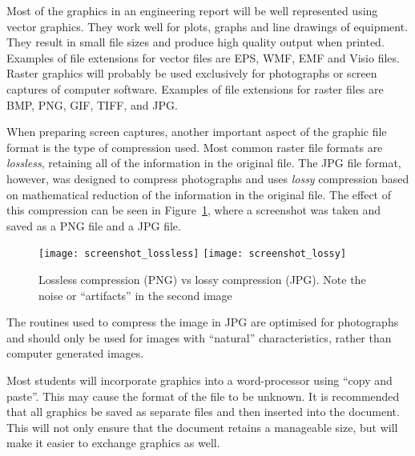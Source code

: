 \documentclass[a4paper,12pt]{article}
\begin{document}
Most of the graphics in an engineering report will be well represented
using vector graphics.  They work well for plots, graphs and line
drawings of equipment.  They result in small file sizes and produce
high quality output when printed.  Examples of file extensions for
vector files are EPS, WMF, EMF and Visio files.  Raster graphics will
probably be used exclusively for photographs or screen captures of
computer software.  Examples of file extensions for raster files are
BMP, PNG, GIF, TIFF, and JPG.

When preparing screen captures, another important aspect of the
graphic file format is the type of compression used.  Most common
raster file formats are \emph{lossless}, retaining all of the
information in the original file.  The JPG file format, however, was
designed to compress photographs and uses \emph{lossy} compression
based on mathematical reduction of the information in the original
file.  The effect of this compression can be seen in
Figure~\ref{fig:jpgexample}, where a screenshot was taken and saved as
a PNG file and a JPG file.

\begin{figure}[htbp]
  \centering
  \texttt{[image: screenshot\_lossless]}
  \texttt{[image: screenshot\_lossy]}
  \caption{Lossless compression (PNG) vs lossy compression (JPG).
    Note the noise or ``artifacts'' in the second image}
  \label{fig:jpgexample}
\end{figure}

The routines used to compress the image in JPG are optimised for
photographs and should only be used for images with ``natural''
characteristics, rather than computer generated images.

Most students will incorporate graphics into a word-processor using
``copy and paste''.  This may cause the format of the file to be
unknown.  It is recommended that all graphics be saved as separate
files and then inserted into the document.  This will not only ensure
that the document retains a manageable size, but will make it easier
to exchange graphics as well.
\end{document}
